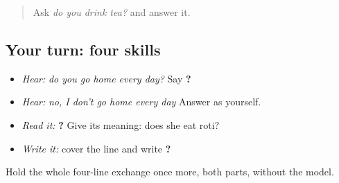 \label{lesson:PA-C215-payoff}



\begin{quote}
Ask \emph{do you drink tea?} and answer it.
\end{quote}

\subsection*{Your turn: four skills}
\begin{itemize}
\raggedright
  \item \emph{Hear:} \emph{do you go home every day?} Say \textbf{     ?}
  \item \emph{Hear:} \emph{no, I don't go home every day} Answer as yourself.
  \item \emph{Read it:} \textbf{    ?} Give its meaning: does she eat roti?
  \item \emph{Write it:} cover the line and write \textbf{    ?}
\end{itemize}

\begin{tcolorbox}[breakable,colback=teal!4,colframe=teal!35!black,title={Before you move on}]
Hold the whole four-line exchange once more, both parts, without the model.
\end{tcolorbox}
